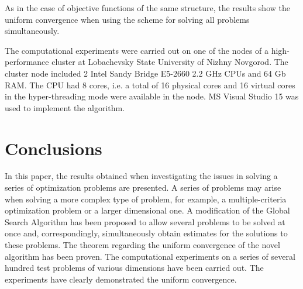 \documentclass[smallcondensed]{svjour3}     %
\begin{document}
As in the case of objective functions of the same structure, the results show the uniform convergence when using the scheme for solving all problems simultaneously.


The computational experiments were carried out on one of the nodes of a high-performance cluster at Lobachevsky State University of Nizhny Novgorod. The cluster node included 2 Intel Sandy Bridge E5-2660 2.2 GHz CPUs and 64 Gb RAM. The CPU had 8 cores, i.e. a total of 16 physical cores and 16 virtual cores in the hyper-threading mode were available in the node. MS Visual Studio 15 was used to implement the algorithm.

\section{Conclusions }

In this paper, the results obtained when investigating the issues in solving a series of optimization problems are presented. A series of problems may arise when solving a more complex type of problem, for example, a multiple-criteria optimization problem or a larger dimensional one. A modification of the Global Search Algorithm has been proposed to allow several problems to be solved at once and, correspondingly, simultaneously obtain estimates for the solutions to these problems. The theorem regarding the uniform convergence of the novel algorithm has been proven. The computational experiments on a series of several hundred test problems of various dimensions have been carried out. The experiments have clearly demonstrated the uniform convergence.

\end{document}
